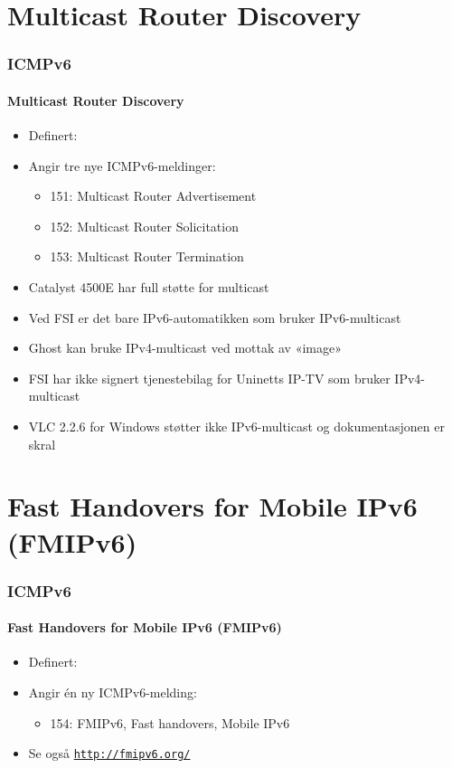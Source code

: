 \section{Multicast Router Discovery}
\begin{frame}
  \frametitle{ICMPv6}
  \framesubtitle{Multicast Router Discovery}
  \begin{itemize}
  \item Definert: 
  \item Angir tre nye ICMPv6-meldinger:
    \begin{itemize}
    \item 151: Multicast Router Advertisement
    \item 152: Multicast Router Solicitation
    \item 153: Multicast Router Termination
    \end{itemize}
  \item Catalyst 4500E har full støtte for multicast
  \item Ved FSI er det bare IPv6-automatikken som bruker
    IPv6-multicast
  \item Ghost kan bruke IPv4-multicast ved mottak av «image»
  \item FSI har ikke signert tjenestebilag for Uninetts IP-TV som
    bruker IPv4-multicast
  \item VLC 2.2.6 for Windows støtter ikke IPv6-multicast og
    dokumentasjonen er skral
  \end{itemize}
\end{frame}

\section{Fast Handovers for Mobile IPv6 (FMIPv6)}
\begin{frame}
  \frametitle{ICMPv6}
  \framesubtitle{Fast Handovers for Mobile IPv6 (FMIPv6)}
  \begin{itemize}
  \item Definert: 
  \item Angir én ny ICMPv6-melding:
    \begin{itemize}
    \item 154: FMIPv6, Fast handovers, Mobile IPv6
    \end{itemize}
  \item Se også \texttt{\url{http://fmipv6.org/}}
  \end{itemize}
\end{frame}

